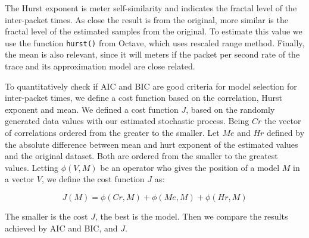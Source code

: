 The Hurst exponent is meter self-similarity and indicates the fractal level of the inter-packet times. As close the result is from the original, more similar is the fractal level of the estimated samples from the original. To estimate this value we use the function \texttt{hurst()} from Octave, which uses rescaled range method. Finally, the mean is also relevant, since it will meters if the packet per second rate of the trace and its approximation model are close related. 

To quantitatively check   if AIC and BIC are good criteria for model selection for inter-packet times, we define a cost function based on the correlation, Hurst exponent and mean. We defined a cost function $J$, based on the randomly generated data values with our estimated stochastic process. Being $Cr$ the vector of correlations ordered from the greater to the smaller. Let $Me$ and $Hr$ defined by the absolute difference between mean and hurt exponent of the estimated values and the original dataset. Both are ordered from the smaller to the greatest values. Letting $\phi(V, M)$ be an operator who gives the position of a model $M$ in a vector $V$, we define the cost function $J$ as:

\begin{equation}
J(M) = \phi(Cr, M) + \phi(Me, M) + \phi(Hr, M)
\end{equation}

The smaller is the cost $J$, the best is the model. Then we compare the results achieved by AIC and BIC, and $J$.



